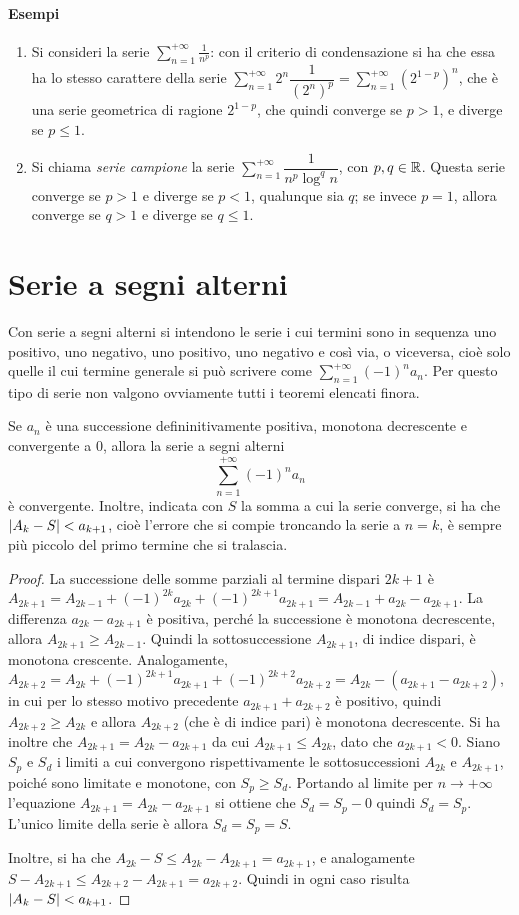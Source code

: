 \paragraph{Esempi}
\begin{enumerate}
\item Si consideri la serie $\sum_{n=1}^{+\infty}\frac1{n^p}$: con il criterio di condensazione si ha che essa ha lo stesso carattere della serie $\sum_{n=1}^{+\infty}2^n\dfrac1{(2^n)^p}=\sum_{n=1}^{+\infty}(2^{1-p})^n$, che è una serie geometrica di ragione $2^{1-p}$, che quindi converge se $p>1$, e diverge se $p\leq 1$.
\item Si chiama \emph{serie campione} la serie $\sum_{n=1}^{+\infty}\dfrac1{n^p\log^q n}$, con $p,q\in\mathbb{R}$. Questa serie converge se $p>1$ e diverge se $p<1$, qualunque sia $q$; se invece $p=1$, allora converge se $q>1$ e diverge se $q\leq 1$.
\end{enumerate}
\section{Serie a segni alterni}
Con serie a segni alterni si intendono le serie i cui termini sono in sequenza uno positivo, uno negativo, uno positivo, uno negativo e così via, o viceversa, cioè solo quelle il cui termine generale si può scrivere come $\sum_{n=1}^{+\infty}(-1)^na_n$. Per questo tipo di serie non valgono ovviamente tutti i teoremi elencati finora.
\begin{teorema}
\label{t:criterio_leibnitz}
Se $a_n$ è una successione defininitivamente positiva, monotona decrescente e convergente a 0, allora la serie a segni alterni
\[
\sum_{n=1}^{+\infty}(-1)^n a_n
\]
è convergente. Inoltre, indicata con $S$ la somma a cui la serie converge, si ha che $\lvert A_k-S\rvert<a_{k+1}$, cioè l'errore che si compie troncando la serie a $n=k$, è sempre più piccolo del primo termine che si tralascia.
\end{teorema}
\begin{proof}
La successione delle somme parziali al termine dispari $2k+1$ è $A_{2k+1}=A_{2k-1}+(-1)^{2k}a_{2k}+(-1)^{2k+1}a_{2k+1}=A_{2k-1}+a_{2k}-a_{2k+1}$. La differenza $a_{2k}-a_{2k+1}$ è positiva, perché la successione è monotona decrescente, allora $A_{2k+1}\geq A_{2k-1}$. Quindi la sottosuccessione $A_{2k+1}$, di indice dispari, è monotona crescente. Analogamente, $A_{2k+2}=A_{2k}+(-1)^{2k+1}a_{2k+1}+(-1)^{2k+2}a_{2k+2}=A_{2k}-(a_{2k+1}-a_{2k+2})$, in cui per lo stesso motivo precedente $a_{2k+1}+a_{2k+2}$ è positivo, quindi $A_{2k+2}\geq A_{2k}$ e allora $A_{2k+2}$ (che è di indice pari) è monotona decrescente.
Si ha inoltre che $A_{2k+1}=A_{2k}-a_{2k+1}$ da cui $A_{2k+1}\leq A_{2k}$, dato che $a_{2k+1}<0$. Siano $S_p$ e $S_d$ i limiti a cui convergono rispettivamente le sottosuccessioni $A_{2k}$ e $A_{2k+1}$, poiché sono limitate e monotone, con $S_p\geq S_d$. Portando al limite per $n\to+\infty$ l'equazione $A_{2k+1}=A_{2k}-a_{2k+1}$ si ottiene che $S_d=S_p-0$ quindi $S_d=S_p$. L'unico limite della serie è allora $S_d=S_p=S$.

Inoltre, si ha che $A_{2k}-S\leq A_{2k}-A_{2k+1}=a_{2k+1}$, e analogamente $S-A_{2k+1}\leq A_{2k+2}-A_{2k+1}=a_{2k+2}$. Quindi in ogni caso risulta $\lvert A_k-S\rvert<a_{k+1}$.
\end{proof}
